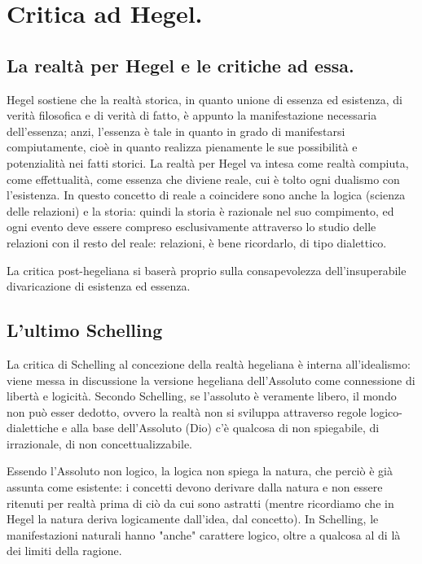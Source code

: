 \chapter{Critica ad Hegel.}
\bigskip
\section{La realtà per Hegel e le critiche ad essa.}

Hegel sostiene che la realtà storica, in quanto unione di essenza ed esistenza, di verità filosofica e di verità di fatto, è appunto la manifestazione necessaria dell'essenza; anzi, l'essenza è tale in quanto in grado di manifestarsi compiutamente, cioè in quanto realizza pienamente le sue possibilità e potenzialità nei fatti storici. La realtà per Hegel va intesa come realtà compiuta, come effettualità, come essenza che diviene reale, cui è tolto ogni dualismo con l'esistenza. In questo concetto di reale a coincidere sono anche la logica (scienza delle relazioni) e la storia: quindi la storia è razionale nel suo compimento, ed ogni evento deve essere compreso esclusivamente attraverso lo studio delle relazioni con il resto del reale: relazioni, è bene ricordarlo,  di tipo dialettico.

La critica post-hegeliana si baserà proprio sulla consapevolezza dell'insuperabile divaricazione di esistenza ed essenza.

\section{L'ultimo Schelling}

La critica di Schelling al concezione della realtà hegeliana è interna all'idealismo: viene messa in discussione la versione hegeliana dell'Assoluto come connessione di libertà e logicità. Secondo Schelling, se l'assoluto è veramente libero, il mondo non può esser dedotto, ovvero la realtà non si sviluppa attraverso regole logico-dialettiche  e alla base dell'Assoluto (Dio) c'è qualcosa di non spiegabile, di irrazionale, di non concettualizzabile.

Essendo l'Assoluto non logico, la logica non spiega la natura, che perciò è già assunta come esistente: i concetti devono derivare dalla natura e non essere ritenuti per realtà prima di ciò da cui sono astratti (mentre ricordiamo che in Hegel la natura deriva logicamente dall'idea, dal concetto). In Schelling, le manifestazioni naturali hanno "anche" carattere logico, oltre a qualcosa al di là dei limiti della ragione.

